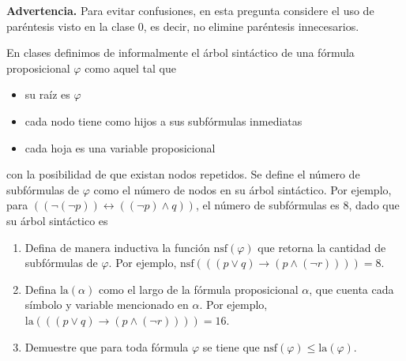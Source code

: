 

\newcommand{\largo}{\text{la}}
\newcommand{\nsf}{\text{nsf}}

\textbf{Advertencia.} Para evitar confusiones, en esta pregunta considere el uso de paréntesis visto en la clase 0, es decir, no elimine paréntesis innecesarios.\medskip

En clases definimos de informalmente el árbol sintáctico de una fórmula proposicional $\varphi$ como aquel tal que
\begin{itemize}
	\item su raíz es $\varphi$
	\item cada nodo tiene como hijos a sus subfórmulas inmediatas
	\item cada hoja es una variable proposicional
\end{itemize}
con la posibilidad de que existan nodos repetidos. Se define el número de subfórmulas de $\varphi$ como el número de nodos en su árbol sintáctico.
Por ejemplo, para $((\neg(\neg p))\leftrightarrow ((\neg p)\wedge q))$, el número de subfórmulas es 8, dado que su árbol sintáctico es 

\begin{center}
	
\end{center}


\begin{enumerate}[label=(\alph*)]

	\item Defina de manera inductiva la función $\nsf(\varphi)$ que retorna la cantidad de subfórmulas de $\varphi$.  Por ejemplo, $\nsf(((p \vee q) \to (p \wedge (\neg r)))) = 8$.

	\item Defina $\largo(\alpha)$ como el largo de la fórmula proposicional $\alpha$, que cuenta cada símbolo y variable mencionado en $\alpha$. Por ejemplo, $\largo(((p \vee q) \to (p \wedge (\neg r))))=16$.
    
    \item Demuestre que para toda fórmula $\varphi$ se tiene que $\nsf(\varphi) \leq \largo(\varphi)$. 
\end{enumerate}